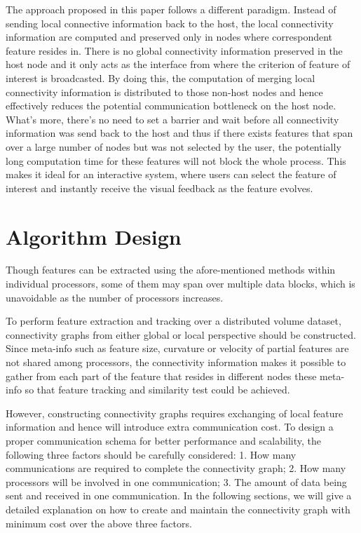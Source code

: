 \documentclass[10pt, conference, compsocconf]{IEEEtran}
\begin{document}
The approach proposed in this paper follows a different paradigm. Instead of sending local connective information back to the host, the local connectivity information are computed and preserved only in nodes where correspondent feature resides in. There is no global connectivity information preserved in the host node and it only acts as the interface from where the criterion of feature of interest is broadcasted. By doing this, the computation of merging local connectivity information is distributed to those non-host nodes and hence effectively reduces the potential communication bottleneck on the host node. What's more, there's no need to set a barrier and wait before all connectivity information was send back to the host and thus if there exists features that span over a large number of nodes but was not selected by the user, the potentially long computation time for these features will not block the whole process. This makes it ideal for an interactive system, where users can select the feature of interest and instantly receive the visual feedback as the feature evolves.

\section{Algorithm Design}
Though features can be extracted using the afore-mentioned methods within individual processors, some of them may span over multiple data blocks, which is unavoidable as the number of processors increases. 

To perform feature extraction and tracking over a distributed volume dataset, connectivity graphs from either global or local perspective should be constructed. Since meta-info such as feature size, curvature or velocity of partial features are not shared among processors, the connectivity information makes it possible to gather from each part of the feature that resides in different nodes these meta-info so that feature tracking and similarity test could be achieved. 

However, constructing connectivity graphs requires exchanging of local feature information and hence will introduce extra communication cost. To design a proper communication schema for better performance and scalability, the following three factors should be carefully considered:
1.	How many communications are required to complete the connectivity graph;
2.	How many processors will be involved in one communication;
3.	The amount of data being sent and received in one communication.
In the following sections, we will give a detailed explanation on how to create and maintain the connectivity graph with minimum cost over the above three factors.
\end{document}
